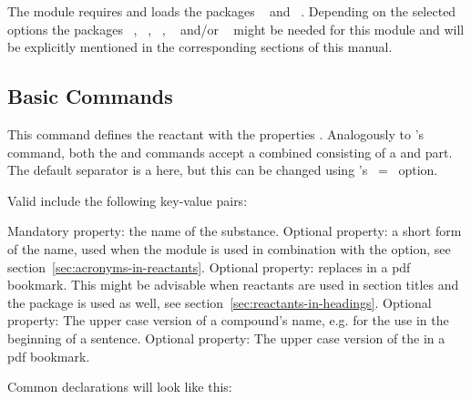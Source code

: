 \documentclass{chemmacros-manual}
\begin{document}
The module requires and loads the packages ~\cite{pkg:chemnum} and
~\cite{pkg:siunitx}. Depending on the selected options the packages 
~\cite{pkg:acro}, ~\cite{pkg:glossaries-extra}, 
~\cite{pkg:hyperref}, ~\cite{pkg:longtable} and/or 
~\cite{pkg:xltabular} might be needed for this module and will be explicitly 
mentioned in the corresponding sections of this manual.

\subsection{Basic Commands}

\begin{commands}
    This command defines the reactant  with the properties
    .
    Analogously to 's  command, both the  and
     commands accept a combined  consisting of a
     and  part. The default separator is a  here, 
    but this can be changed using 's ~=~ option.
\end{commands}
Valid  include the following key-value pairs:
\begin{options}
    Mandatory property: the name of the substance.
    Optional property: a short form of the name, used when the  module is 
    used in combination with the  option, see 
    section~\vref{sec:acronyms-in-reactants}.
    Optional property: replaces  in a \ac{pdf} bookmark.  This might be advisable 
    when reactants are used in section titles and the  package is used as
    well, see section~\vref{sec:reactants-in-headings}.
    Optional property: The upper case version of a compound's name, e.g. for the use in the beginning of a sentence.
    Optional property: The upper case version of the  in a \ac{pdf} bookmark.
\end{options}

Common declarations will look like this:
\begin{sourcecode}
\end{sourcecode}
\end{document}
